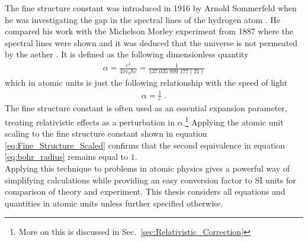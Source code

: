         The fine structure constant was introduced in 1916 by Arnold Sommerfeld when he was investigating the gap in the spectral lines of the hydrogen atom \cite{Sommerfeld_1916}. He compared his work with the Michelson Morley experiment from 1887 where the spectral lines were shown and it was deduced that the universe is not permeated by the aether \cite{Michelson_Morley_1887}. It is defined as the following dimensionless quantity
        \begin{align}
            \alpha = \frac{e^2}{4\pi \epsilon_0 \hbar c} = \frac{1}{137.035\;999\;177(21)}
        \end{align}
        \noindent which in atomic units is just the following relationship with the speed of light 
        \begin{align}
            \alpha = \frac{1}{c} \label{eq:Fine_Structure_Scaled}\;.
        \end{align}
        \noindent The fine structure constant is often used as an essential expansion parameter, treating relativistic effects as a perturbation in $\alpha$.\footnote{More on this is discussed in Sec.~\ref{sec:Relativistic_Correction}} Applying the atomic unit scaling to the fine structure constant shown in equation \eqref{eq:Fine_Structure_Scaled} confirms that the second equivalence in equation \eqref{eq:bohr_radius} remains equal to $1$. \\

        Applying this technique to problems in atomic physics gives a powerful way of simplifying calculations while providing an easy conversion factor to SI units for comparison of theory and experiment. This thesis considers all equations and quantities in atomic units unless further specified otherwise.


